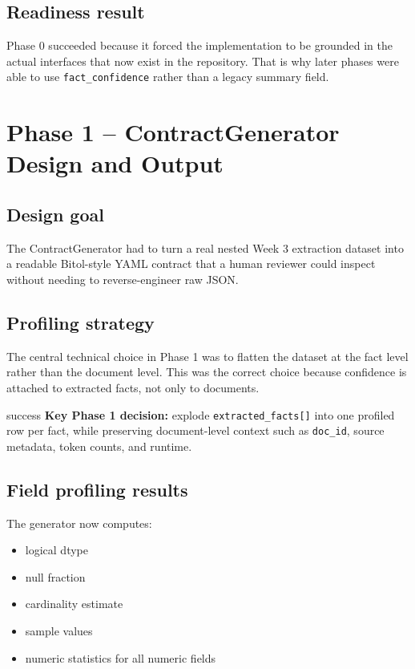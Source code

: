 \documentclass[11pt]{report}
\begin{document}
\section{Readiness result}
Phase 0 succeeded because it forced the implementation to be grounded in the actual interfaces that now exist in the repository. That is why later phases were able to use \texttt{fact\_confidence} rather than a legacy summary field.

\clearpage
\chapter{Phase 1 -- ContractGenerator Design and Output}

\section{Design goal}
The ContractGenerator had to turn a real nested Week 3 extraction dataset into a readable Bitol-style YAML contract that a human reviewer could inspect without needing to reverse-engineer raw JSON.

\section{Profiling strategy}
The central technical choice in Phase 1 was to flatten the dataset at the fact level rather than the document level. This was the correct choice because confidence is attached to extracted facts, not only to documents.

\begin{statusbox}{success}
\textbf{Key Phase 1 decision:} explode \texttt{extracted\_facts[]} into one profiled row per fact, while preserving document-level context such as \texttt{doc\_id}, source metadata, token counts, and runtime.
\end{statusbox}

\section{Field profiling results}
The generator now computes:
\begin{itemize}[leftmargin=1.5em]
  \item logical dtype
  \item null fraction
  \item cardinality estimate
  \item sample values
  \item numeric statistics for all numeric fields
\end{itemize}
\end{document}
